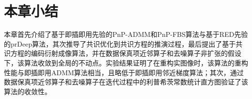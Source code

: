 \section{本章小结}
本章首先介绍了基于即插即用先验的PnP-ADMM和PnP-FBS算法与基于RED先验的prDeep算法，其次推导了共识优化到共识方程的推演过程，最后提出了基于共识方程的编码衍射成像算法，并在数据保真项近邻算子和去噪算子非扩张的假设下，该算法收敛到全局的不动点。实验结果证明了在重构实图像时，该算法的重构性能与即插即用ADMM算法相当，且略低于即插即用邻近梯度算法；其次，通过数据保真项近邻算子和去噪算子在迭代过程中的利普希茨常数统计直方图验证了该算法的收敛性。

